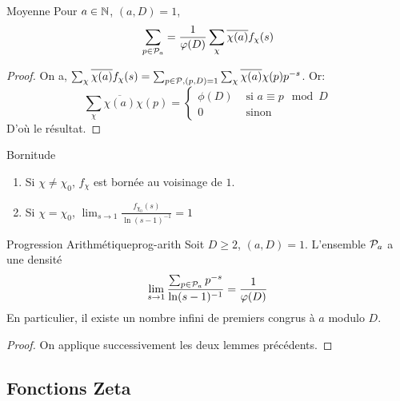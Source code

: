 \documentclass{cours}
\begin{document}
\begin{lemme}
	{Moyenne}{}
	Pour $a \in \mathbb{N}$, $(a, D) = 1$, 
	\begin{equation*}
		\sum_{p \in \mathcal{P}_{a}} = \frac{1}{\varphi(D)}\sum_{\chi}\overline{\chi(a)}f_{\chi}(s)
	\end{equation*}
\end{lemme}
\begin{proof}
	On a, $\sum_{\chi}\overline{\chi(a)}f_{\chi}(s) = \sum_{p\in \mathcal{P}, (p, D) = 1}\sum_{\chi}\overline{\chi(a)}\chi(p)p^{-s}$.
	Or: 
	\begin{equation*}
		\sum_{\chi}\overline{\chi(a)}\chi(p) = \begin{cases} \phi(D) & \text{ si } a\equiv p \mod D\\
			0 & \text{ sinon }
		\end{cases}
	\end{equation*}
	D'où le résultat. 
\end{proof}

\begin{lemme}
	{Bornitude}{}
	\begin{enumerate}
		\item Si $\chi \neq \chi_{0}$, $f_{\chi}$ est bornée au voisinage de $1$. 
		\item Si $\chi = \chi_{0}$, $\lim_{s \to 1}\frac{f_{\chi_{0}}(s)}{\ln(s - 1)^{-1}} = 1$
	\end{enumerate}
\end{lemme}

\begin{théorème}
	{Progression Arithmétique}{prog-arith}
	Soit $D \geq 2$, $(a, D) = 1$. L'ensemble $\mathcal{P}_{a}$ a une densité 
	\begin{equation*}
		\lim_{s \to 1}\frac{\sum_{p \in \mathcal{P}_{a}}p^{- s}}{\ln(s - 1)^{-1}} = \frac{1}{\varphi(D)}
	\end{equation*}
	En particulier, il existe un nombre infini de premiers congrus à $a$ modulo $D$. 
\end{théorème}
\begin{proof}
	On applique successivement les deux lemmes précédents. 
\end{proof}

\subsection{Fonctions Zeta}
\end{document}
